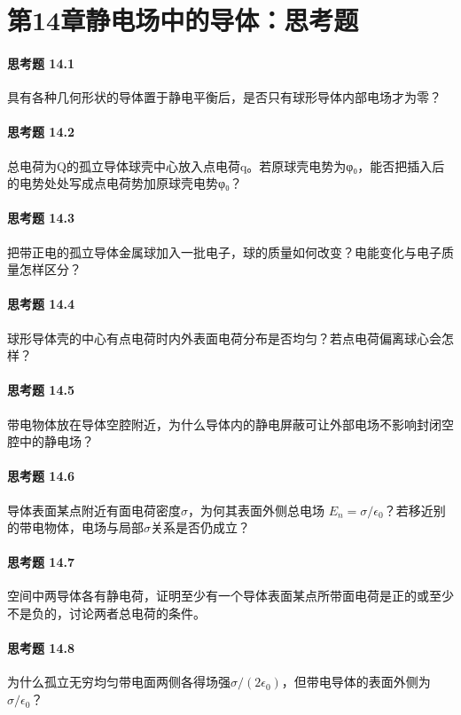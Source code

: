 \section*{第14章\quad 静电场中的导体：思考题}
\paragraph{思考题 14.1}
具有各种几何形状的导体置于静电平衡后，是否只有球形导体内部电场才为零？

\paragraph{思考题 14.2}
总电荷为Q的孤立导体球壳中心放入点电荷q。若原球壳电势为φ₀，能否把插入后的电势处处写成点电荷势加原球壳电势φ₀？

\paragraph{思考题 14.3}
把带正电的孤立导体金属球加入一批电子，球的质量如何改变？电能变化与电子质量怎样区分？

\paragraph{思考题 14.4}
球形导体壳的中心有点电荷时内外表面电荷分布是否均匀？若点电荷偏离球心会怎样？

\paragraph{思考题 14.5}
带电物体放在导体空腔附近，为什么导体内的静电屏蔽可让外部电场不影响封闭空腔中的静电场？

\paragraph{思考题 14.6}
导体表面某点附近有面电荷密度\(\sigma\)，为何其表面外侧总电场 \(E_n=\sigma/\epsilon_0\)？若移近别的带电物体，电场与局部\(\sigma\)关系是否仍成立？

\paragraph{思考题 14.7}
空间中两导体各有静电荷，证明至少有一个导体表面某点所带面电荷是正的或至少不是负的，讨论两者总电荷的条件。

\paragraph{思考题 14.8}
为什么孤立无穷均匀带电面两侧各得场强\(\sigma/(2\epsilon_0)\)，但带电导体的表面外侧为\(\sigma/\epsilon_0\)？

